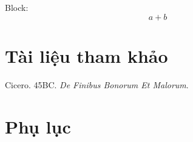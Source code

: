 \documentclass[14pt,oneside]{scrbook}
\newlength{\cslhangindent}
\newenvironment{CSLReferences}[2] %
{\begin{list}{}{%
\setlength{\itemindent}{0pt}
\setlength{\leftmargin}{0pt}
\setlength{\parsep}{0pt}
\ifodd #1
\setlength{\leftmargin}{\cslhangindent}
\setlength{\itemindent}{-1\cslhangindent}
\fi
\setlength{\itemsep}{#2\baselineskip}}}
{\end{list}}
\begin{document}
Block: \[a+b\]

\chapter{Tài liệu tham khảo}\label{tuxe0i-liux1ec7u-tham-khux1ea3o}

\label{refs-main}
\begin{CSLReferences}{1}{0}
Cicero. 45BC. \emph{De Finibus Bonorum Et Malorum}.

\end{CSLReferences}

\chapter{Phụ lục}\label{phux1ee5-lux1ee5c}
\backmatter
\end{document}
